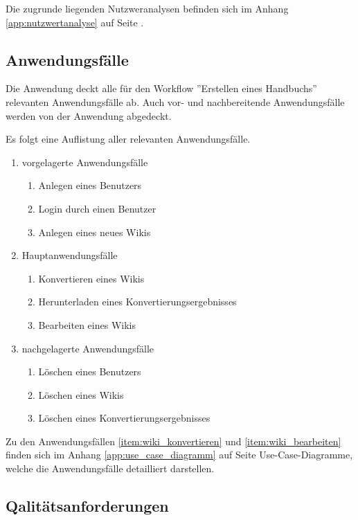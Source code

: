 \documentclass[12pt, xcolor=dvipsnames]{scrartcl}
\begin{document}
Die zugrunde liegenden Nutzweranalysen befinden sich im Anhang \ref{app:nutzwertanalyse} auf Seite \pageref{app:nutzwertanalyse}.

\subsection{Anwendungsfälle}

Die Anwendung deckt alle für den Workflow ''Erstellen eines Handbuchs'' relevanten Anwendungsfälle ab. Auch vor- und nachbereitende Anwendungsfälle werden von der Anwendung abgedeckt.

Es folgt eine Auflistung aller relevanten Anwendungsfälle.

\begin{enumerate}
	\item vorgelagerte Anwendungsfälle
	\begin{enumerate}
		\item Anlegen eines Benutzers		
		\item Login durch einen Benutzer
		\item Anlegen eines neues Wikis	
	\end{enumerate}
	\item Hauptanwendungsfälle
	\begin{enumerate}
		\item Konvertieren eines Wikis \label{item:wiki_konvertieren}
		\item Herunterladen eines Konvertierungsergebnisses
		\item Bearbeiten eines Wikis \label{item:wiki_bearbeiten}
	\end{enumerate}
	\item nachgelagerte Anwendungsfälle
	\begin{enumerate}
		\item Löschen eines Benutzers
		\item Löschen eines Wikis
		\item Löschen eines Konvertierungsergebnisses
	\end{enumerate}
\end{enumerate}

Zu den Anwendungsfällen \ref{item:wiki_konvertieren} und \ref{item:wiki_bearbeiten} finden sich im Anhang \ref{app:use_case_diagramm} auf Seite \pageref{app:use_case_diagramm} Use-Case-Diagramme, welche die Anwendungsfälle detailliert darstellen.


\subsection{Qalitätsanforderungen}
\end{document}
